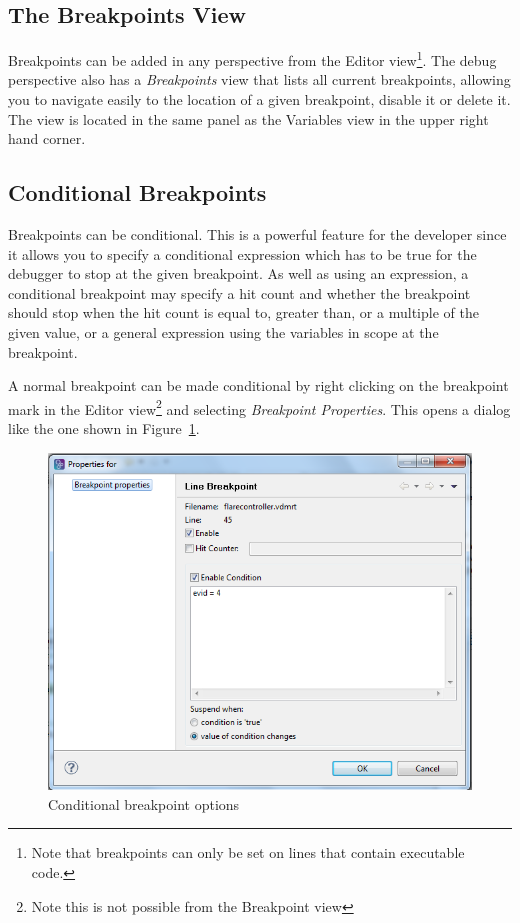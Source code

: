 \documentclass{overturerepchap}
\begin{document}
\subsection{The Breakpoints View}

Breakpoints can be added in any perspective from the Editor view\footnote{Note that
breakpoints can only be set on lines that contain executable code.}.
The debug perspective also has a \emph{Breakpoints} view that lists all current
breakpoints, allowing you to navigate easily to the location of a given breakpoint,
disable it or delete it. The view is located in
the same panel as the Variables view in the upper right hand corner.


\subsection{Conditional Breakpoints}
\label{sec:userguide:breakpoints}

Breakpoints can be conditional. This is a powerful feature for the
developer since it allows you to specify a conditional expression 
which has to be true for the debugger to stop at the given breakpoint.
As well as using an expression, a conditional breakpoint may specify a
hit count and whether the breakpoint should stop when the hit count is
equal to, greater than, or a multiple of the given value, or a general
expression using the variables in scope at the breakpoint.

A normal breakpoint can be made conditional by right clicking on the breakpoint
mark in the Editor view\footnote{Note this is not possible from the Breakpoint view}
and selecting \emph{Breakpoint Properties}. This opens a dialog like the one shown in
Figure~\ref{fig:userguide:BreakpointConditional}.

\begin{figure}[htp]
\begin{center}
  \includegraphics[width=.6\textwidth]{figures/Breakpointconditional}
  \caption{Conditional breakpoint options}
  \label{fig:userguide:BreakpointConditional}
\end{center}
\end{figure}
\end{document}
